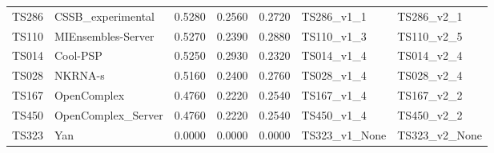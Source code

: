 \begin{table}[ht]
{\begin{tabular}{llrrrll}
TS286 & CSSB\_experimental & 0.5280 & 0.2560 & 0.2720 & TS286\_v1\_1 & TS286\_v2\_1 \\ 
TS110 & MIEnsembles-Server & 0.5270 & 0.2390 & 0.2880 & TS110\_v1\_3 & TS110\_v2\_5 \\ 
TS014 & Cool-PSP & 0.5250 & 0.2930 & 0.2320 & TS014\_v1\_4 & TS014\_v2\_4 \\ 
TS028 & NKRNA-s & 0.5160 & 0.2400 & 0.2760 & TS028\_v1\_4 & TS028\_v2\_4 \\ 
TS167 & OpenComplex & 0.4760 & 0.2220 & 0.2540 & TS167\_v1\_4 & TS167\_v2\_2 \\ 
TS450 & OpenComplex\_Server & 0.4760 & 0.2220 & 0.2540 & TS450\_v1\_4 & TS450\_v2\_2 \\ 
TS323 & Yan & 0.0000 & 0.0000 & 0.0000 & TS323\_v1\_None & TS323\_v2\_None \\ 
\bottomrule
\end{tabular}%
}
\end{table}
